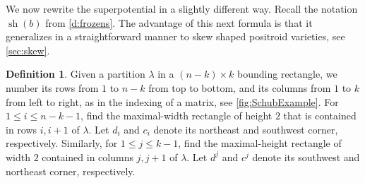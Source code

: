 \documentclass{amsart}
\theoremstyle{definition}
\newtheorem{definition}[thm]{Definition}
\numberwithin{equation}{section}
\def\sh{\operatorname{sh}}
\begin{document}
We now rewrite the superpotential in a slightly different way. 
Recall the notation $\sh(b)$ from \cref{d:frozens}.
The advantage of this next formula is that it generalizes
in a straightforward manner to skew shaped positroid varieties, see 
\cref{sec:skew}.

\begin{definition}\label{d:2recs}
Given a partition $\lambda$ in a $(n-k) \times k$ bounding rectangle,
we number its rows from $1$ to $n-k$ from top to bottom,
and its columns from $1$ to $k$ from left to right, as in the indexing
	of a matrix, see \cref{fig:SchubExample}.
For $1\leq i \leq n-k-1$, find the maximal-width rectangle of height $2$
that is contained in rows $i, i+1$ of $\lambda$.  
Let $d_i$ and $c_i$ denote its northeast and southwest corner, respectively.
Similarly, for $1\leq j \leq k-1$, find the maximal-height rectangle
of width $2$ contained in columns $j, j+1$ of $\lambda$.
Let $d^j$ and $c^j$ denote its southwest and northeast corner, respectively.
\end{definition}
\end{document}
